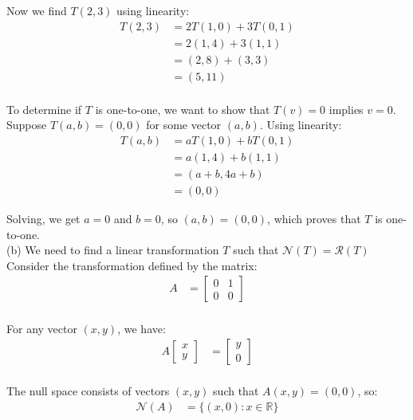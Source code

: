 \documentclass{article}
\begin{document}
Now we find $T(2,3)$ using linearity:
\begin{align*}
T(2,3) &= 2T(1,0) + 3T(0,1)\\
&= 2(1,4) + 3(1,1)\\
&= (2,8) + (3,3)\\
&= (5,11)\\
\end{align*}

To determine if $T$ is one-to-one, we want to show that $T(v) = 0$ implies $v = 0$. \\

Suppose $T(a,b) = (0,0)$ for some vector $(a,b)$. Using linearity:
\begin{align*}
T(a,b) &= aT(1,0) + bT(0,1)\\
&= a(1,4) + b(1,1)\\
&= (a+b, 4a+b)\\
&= (0,0)
\end{align*}

Solving, we get $a = 0$ and $b = 0$, so $(a,b) = (0,0)$, which proves that $T$ is one-to-one. \\

(b) We need to find a linear transformation $T$ such that $\mathcal{N}(T) = \mathcal{R}(T)$ \\

Consider the transformation defined by the matrix:
\begin{align*}
A &= \begin{bmatrix} 0 & 1 \\ 0 & 0 \end{bmatrix}\\
\end{align*}

For any vector $(x,y)$, we have:
\begin{align*}
A\begin{bmatrix} x \\ y \end{bmatrix} &= \begin{bmatrix} y \\ 0 \end{bmatrix}\\
\end{align*}

The null space consists of vectors $(x,y)$ such that $A(x,y) = (0,0)$, so:
\begin{align*}
\mathcal{N}(A) &= \{(x,0) : x \in \mathbb{R}\}\\
\end{align*}
\end{document}
